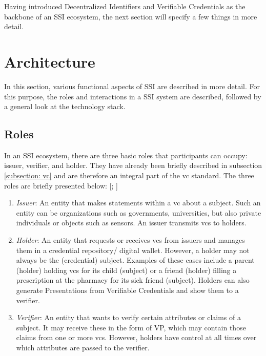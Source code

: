         Having introduced Decentralized Identifiers and Verifiable Credentials as the backbone of an \ac{SSI} ecosystem, the next section will specify a few things in more detail.
	   
    \section{Architecture}
        In this section, various functional aspects of \ac{SSI} are described in more detail. For this purpose, the roles and interactions in a \ac{SSI} system are described, followed by a general look at the technology stack.
        
    	\subsection{Roles}
    	
    	In an SSI ecosystem, there are three basic roles that participants can occupy: issuer, verifier, and holder. They have already been briefly described in subsection \ref{subsection: vc} and are therefore an integral part of the \ac{vc} standard. The three roles are briefly presented below: [\citealp[pp. 25-26]{preukschat_self-sovereign_2021}; \citealp{sporny_verifiable_2019}]
    	
    	\begin{enumerate}
        	\item \textit{Issuer}: An entity that makes statements within a \ac{vc} about a subject. Such an entity can be organizations such as governments, universities, but also private individuals or objects such as sensors. An issuer transmits \acp{vc} to holders.
        	\item \textit{Holder}: An entity that requests or receives \acp{vc} from issuers and manages them in a credential repository/ digital wallet. However, a holder may not always be the (credential) subject. Examples of these cases include a parent (holder) holding \acp{vc} for its child (subject) or a friend (holder) filling a prescription at the pharmacy for its sick friend (subject). Holders can also generate Presentations from Verifiable Credentials and show them to a verifier.  
        	\item \textit{Verifier}: An entity that wants to verify certain attributes or claims of a subject. It may receive these in the form of \ac{VP}, which may contain those claims from one or more \acp{vc}. However, holders have control at all times over which attributes are passed to the verifier.
        \end{enumerate}
        
